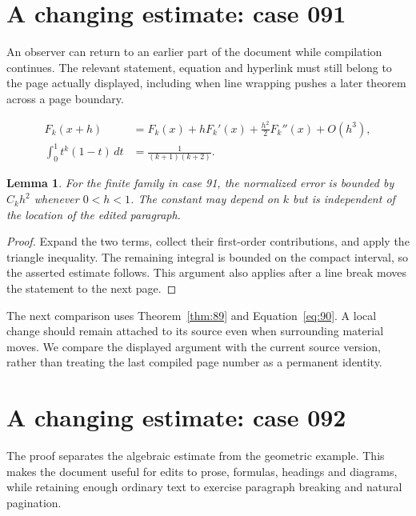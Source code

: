 \documentclass[a4paper,10pt]{article}
\newtheorem{lemma}[theorem]{Lemma}
\begin{document}
\lipsum[23]

\section{A changing estimate: case 091}\label{unit:90}
An observer can return to an earlier part of the document while compilation continues. The relevant statement, equation and hyperlink must still belong to the page actually displayed, including when line wrapping pushes a later theorem across a page boundary.

\lipsum[1-2]
\begin{align}\label{eq:90}
 F_k(x+h)&=F_k(x)+hF_k'(x)+\frac{h^2}{2}F_k''(x)+O(h^3),\\
 \int_0^1 t^k(1-t)\,dt&=\frac{1}{(k+1)(k+2)}.
\end{align}
\begin{lemma}\label{thm:90}
For the finite family in case 91, the normalized error is bounded by $C_k h^2$ whenever $0<h<1$. The constant may depend on $k$ but is independent of the location of the edited paragraph.
\end{lemma}
\begin{proof}
Expand the two terms, collect their first-order contributions, and apply the
triangle inequality. The remaining integral is bounded on the compact interval,
so the asserted estimate follows. This argument also applies after a line break
moves the statement to the next page.
\end{proof}
The next comparison uses Theorem~\ref{thm:89} and Equation~\ref{eq:90}. A local change should remain attached to its source even when surrounding material moves. We compare the displayed argument with the current source version, rather than treating the last compiled page number as a permanent identity.

\lipsum[3]

\section{A changing estimate: case 092}\label{unit:91}
The proof separates the algebraic estimate from the geometric example. This makes the document useful for edits to prose, formulas, headings and diagrams, while retaining enough ordinary text to exercise paragraph breaking and natural pagination.
\end{document}
